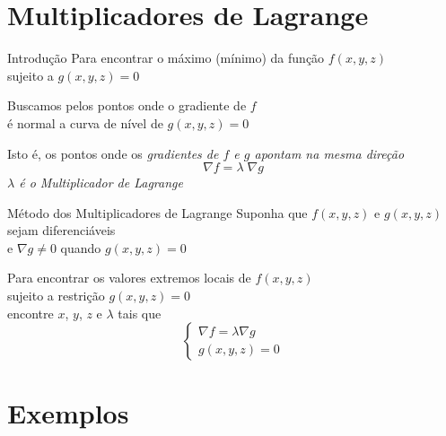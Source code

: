 \documentclass[fleqn,utf8,aspectratio=169,12pt,ignorenonframetext]{beamer}
\begin{document}
\section{Multiplicadores de Lagrange}

\begin{frame}{Introdução}
  Para encontrar o máximo (mínimo) da função \(f(x, y, z)\)\\[2mm]
  sujeito a \(g(x, y, z) = 0\)

  \pause
  \vspace{\baselineskip}
  Buscamos pelos pontos onde o gradiente de $f$ \\
  é normal a curva de nível de \(g(x, y, z) = 0\)

  \pause
  \vspace{\baselineskip}
  Isto é, os pontos onde os \emph{gradientes de $f$ e $g$ apontam na mesma direção}
  \pause
  \[
    \nabla f = \lambda\;\nabla g
  \]
  \pause
  \emph{\(\lambda\) é o Multiplicador de Lagrange}
\end{frame}


\begin{frame}{Método dos Multiplicadores de Lagrange}
  Suponha que \(f(x, y, z)\) e \(g(x, y, z)\) sejam diferenciáveis\\[2mm]
  e \(\nabla g\neq 0\) quando \(g(x, y, z)=0\)

  \pause
  \vspace{\baselineskip}
  Para encontrar os valores extremos locais de \(f(x, y, z)\) \\[2mm]
  \pause
  sujeito a restrição \(g(x, y, z)=0\) \\[2mm]
  \pause
  encontre $x$, $y$, $z$ e $\lambda$ tais que
  \[
    \begin{cases}
      \nabla f = \lambda \nabla g   \\
      g(x, y, z) = 0
    \end{cases}
  \]
\end{frame}

\section{Exemplos}
\end{document}

